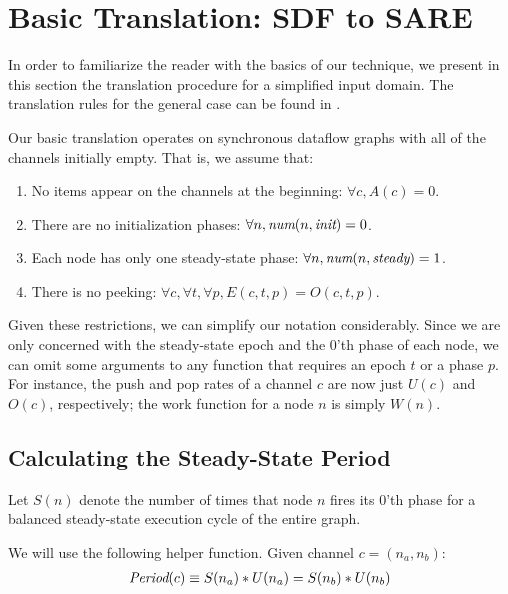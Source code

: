 \section{Basic Translation: SDF to SARE}
\label{sec:simple}

In order to familiarize the reader with the basics of our technique,
we present in this section the translation procedure for a simplified
input domain.  The translation rules for the general case can be found
in .

Our basic translation operates on synchronous dataflow graphs with all
of the channels initially empty.  That is, we assume that:
\begin{enumerate}

\item No items appear on the channels at the beginning:  $\forall c, A(c) = 0$.

\item There are no initialization phases: $\forall n, \mbox{\it num}(n, \mbox{\it init}) = 0$.

\item Each node has only one steady-state phase: $\forall n, \mbox{\it num}(n, \mbox{\it steady}) = 1$.

\item There is no peeking: $\forall c, \forall t, \forall p, E(c, t, p) = O(c, t, p)$.

\end{enumerate}

Given these restrictions, we can simplify our notation considerably.
Since we are only concerned with the steady-state epoch and the 0'th
phase of each node, we can omit some arguments to any function that
requires an epoch $t$ or a phase $p$.  For instance, the push and pop
rates of a channel $c$ are now just $U(c)$ and $O(c)$, respectively;
the work function for a node $n$ is simply $W(n)$.

\subsection{Calculating the Steady-State Period}

Let $S(n)$ denote the number of times that node $n$ fires its 0'th
phase for a balanced steady-state execution cycle of the entire
graph. 

We will use the following helper function.  Given channel $c = (n_a, n_b)$:
\begin{align*}
\mbox{\it Period}(c) \equiv S(n_a) * U(n_a) = S(n_b) * U(n_b)
\end{align*}

